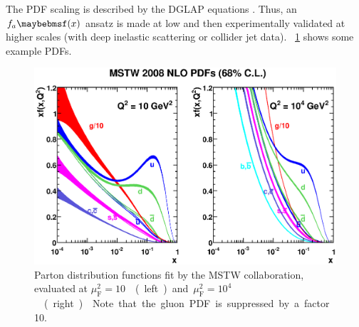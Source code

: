 The \ac{PDF} \muf scaling is described by the DGLAP equations 
\cite{Gribov:1972,Altarelli:1977,Dokshitser:1977}. Thus, an $f_a \parenths{x}$ ansatz is 
made at low \muf and then experimentally validated at higher scales (\eg with deep 
inelastic scattering or collider jet data). \Figure~\ref{fig:qcd:pdf} shows some example 
\acp{PDF}.

\begin{figure}
	\includegraphics[width=\largefigwidth]{tex/tools/pdf}
	\caption{Parton distribution functions fit by the MSTW collaboration, evaluated at 
	\unit{$\mu_{\text{F}}^2 = 10$}{\GeV\squared} (left) and 
	\unit{$\mu_{\text{F}}^2 = 10^4$}{\GeV\squared} (right) \cite{MSTW}. Note that the 
	gluon PDF is suppressed by a factor 10.}
	\label{fig:qcd:pdf}
\end{figure}
